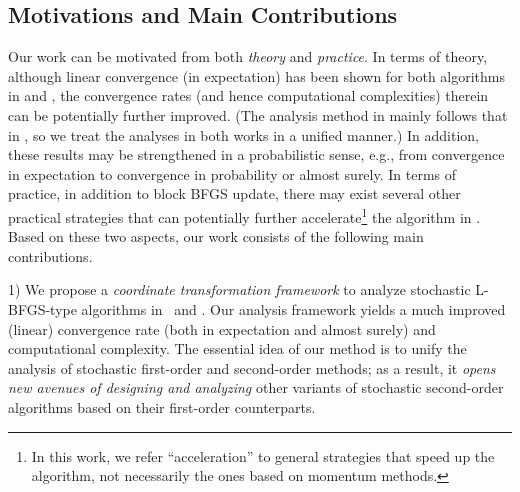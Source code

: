 \documentclass[10pt,twocolumn,journal]{IEEEtran}
\begin{document}
\subsection{Motivations and Main Contributions}\label{sec:contributions}
Our work can be motivated from both {\em theory} and {\em practice}. In terms of theory, although linear convergence (in expectation) has been shown for both algorithms in \cite{Moritz_16} and \cite{Gower_16}, the convergence rates (and hence computational complexities) therein can be potentially further improved. (The analysis method in \cite{Gower_16} mainly follows that in \cite{Moritz_16}, so we treat the analyses in both works in a unified manner.) %
In addition, these results may be strengthened in a probabilistic sense, e.g., from convergence in expectation to convergence in probability or almost surely. 
In terms of practice, in addition to block BFGS update, there may exist several other practical strategies that can potentially further accelerate\footnote{In this work, we refer ``acceleration'' to general strategies that speed up the algorithm, not necessarily the ones based on momentum methods.} the algorithm in \cite{Moritz_16}. 
Based on these two aspects, our work consists of the following main contributions.

1) We propose a {\em coordinate transformation framework} to analyze   stochastic L-BFGS-type algorithms in~\cite{Moritz_16} and \cite{Gower_16}. Our analysis framework yields {a} much improved (linear) convergence rate (both in expectation and almost surely) and computational complexity. %
The essential idea of our method is to unify the analysis of stochastic first-order and second-order methods; as a result, it {\em opens new avenues of designing and analyzing} other variants of  stochastic second-order algorithms based on their first-order counterparts. 

%
\end{document}
